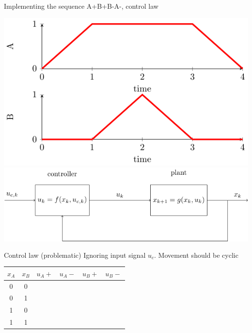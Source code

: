 \documentclass[presentation,aspectratio=1610]{beamer}
\begin{document}
\begin{frame}[label={sec:org29852ff}]{Implementing the sequence A+B+B-A-, control law}
\begin{center}
\includegraphics[width=0.3\linewidth]{../figures/AplusBplusBminAmin}
\includegraphics[width=0.68\linewidth]{../figures/logic-control-loop}
\end{center}
\begin{block}{Control law (problematic)}
Ignoring input signal \(u_c\). Movement should be cyclic

\begin{center}
\begin{tabular}{|cc|cccc|}
\hline
\(x_A\) & \(x_B\) & \(u_A+\) & \(u_A-\) & \(u_B+\) & \(u_B-\)\\
\hline
0 & 0 &  &  &  & \\
0 & 1 &  &  &  & \\
1 & 0 &  &  &  & \\
1 & 1 &  &  &  & \\
\hline
\end{tabular}
\end{center}
\end{block}
\end{frame}
\end{document}
